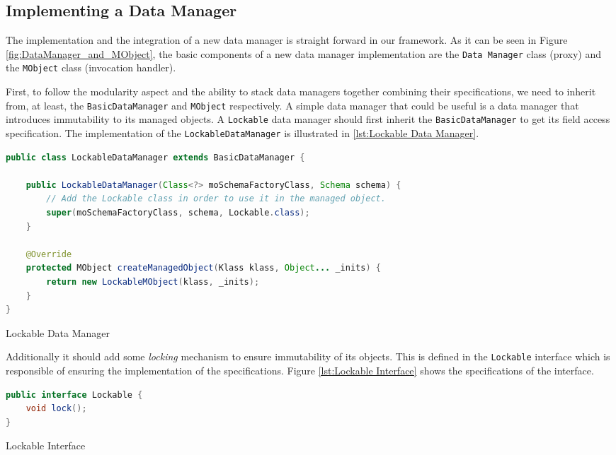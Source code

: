 \subsection{Implementing a Data Manager}\label{Implementing a Data Manager}
The implementation and the integration of a new data manager is straight forward in our framework.
As it can be seen in Figure \ref{fig:DataManager_and_MObject}, the basic components of a new data manager implementation are the \texttt{Data Manager} class (proxy) and the \texttt{MObject} class (invocation handler).

First, to follow the modularity aspect and the ability to stack data managers together combining their specifications, we need to inherit from, at least, the \texttt{BasicDataManager} and \texttt{MObject} respectively.
A simple data manager that could be useful is a data manager that introduces immutability to its managed objects.
A \texttt{Lockable} data manager should first inherit the \texttt{BasicDataManager} to get its field access specification.
The implementation of the \texttt{LockableDataManager} is illustrated in \ref{lst:Lockable Data Manager}.

\begin{sourcecode} [H]
	\begin{lstlisting}[language=Java, escapechar=|]
public class LockableDataManager extends BasicDataManager {

	public LockableDataManager(Class<?> moSchemaFactoryClass, Schema schema) {
		// Add the Lockable class in order to use it in the managed object.
		super(moSchemaFactoryClass, schema, Lockable.class);
	}

	@Override
	protected MObject createManagedObject(Klass klass, Object... _inits) {
		return new LockableMObject(klass, _inits);
	}
}
	\end{lstlisting}
	\caption{Lockable Data Manager}
	\label{lst:Lockable Data Manager}
\end{sourcecode}

Additionally it should add some \textit{locking} mechanism to ensure immutability of its objects.
This is defined in the \texttt{Lockable} interface which is responsible of ensuring the implementation of the specifications. Figure \ref{lst:Lockable Interface} shows the specifications of the interface.

\begin{sourcecode} [H]
	\begin{lstlisting}[language=Java, escapechar=|]
public interface Lockable {
	void lock();
}
	\end{lstlisting}
	\caption{Lockable Interface}
	\label{lst:Lockable Interface}
\end{sourcecode}

